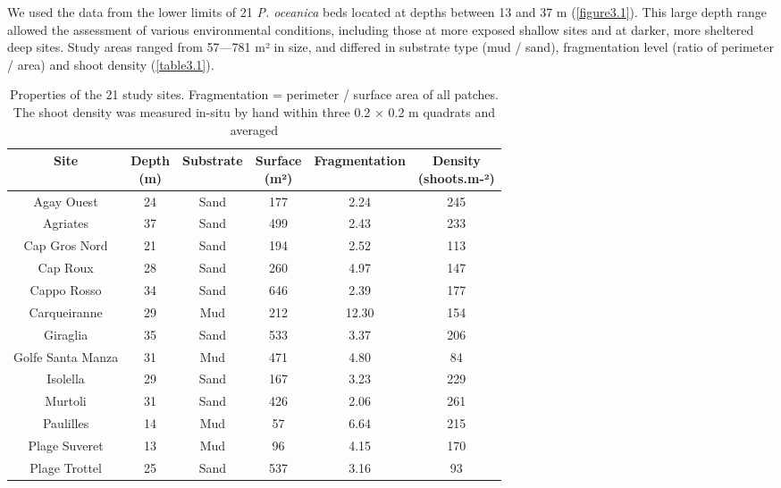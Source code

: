 We used the data from the lower limits of 21 \textit{P. oceanica} beds located at depths between 13 and 37 m (\autoref{figure3.1}). This large depth range allowed the assessment of various environmental conditions, including those at more exposed shallow sites and at darker, more sheltered deep sites. Study areas ranged from 57---781 m² in size, and differed in substrate type (mud / sand), fragmentation level (ratio of perimeter / area) and shoot density (\autoref{table3.1}).

\begin{table}[H]
  \centering
  \normalsize
  \caption[Properties of the 21 study sites]{Properties of the 21 study sites. Fragmentation = perimeter / surface area of all patches. The shoot density was measured in-situ by hand within three 0.2 $\times$ 0.2 m quadrats and averaged}
  \label{table3.1}
    \begin{tabular}{*{6}{c}}
        \toprule
        \textbf{Site} & \makecell{\textbf{Depth} \\ \textbf{(m)}} & \textbf{Substrate} & \makecell{\textbf{Surface} \\ \textbf{(m²)}} & \textbf{Fragmentation} & \makecell{\textbf{Density} \\ \textbf{(shoots.m-²)}} \\ \midrule
        Agay Ouest & 24 & Sand & 177 & 2.24 & 245 \\
        Agriates & 37 & Sand & 499 & 2.43 & 233 \\
        Cap Gros Nord & 21 & Sand & 194 & 2.52 & 113 \\
        Cap Roux & 28 & Sand & 260 & 4.97 & 147 \\
        Cappo Rosso & 34 & Sand & 646 & 2.39 & 177 \\
        Carqueiranne & 29 & Mud & 212 & 12.30 & 154 \\
        Giraglia & 35 & Sand & 533 & 3.37 & 206 \\
        Golfe Santa Manza & 31 & Mud & 471 & 4.80 & 84 \\
        Isolella & 29 & Sand & 167 & 3.23 & 229 \\
        Murtoli & 31 & Sand & 426 & 2.06 & 261 \\
        Paulilles & 14 & Mud & 57 & 6.64 & 215 \\
        Plage Suveret & 13 & Mud & 96 & 4.15 & 170 \\
        Plage Trottel & 25 & Sand & 537 & 3.16 & 93 \\

\end{tabular}
\end{table}
